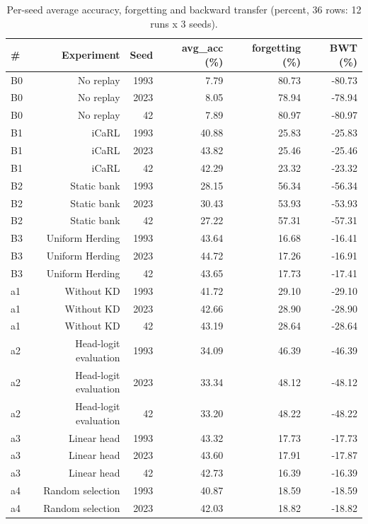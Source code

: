 \documentclass{article}
\begin{document}
\begin{table}[htbp]
  \centering
  \caption{Per-seed average accuracy, forgetting and backward transfer (percent, 36 rows: 12 runs x 3 seeds).}
  \label{tab:A4_per_seed_metrics}
  \begin{tabular}{lrrrrr}
    \toprule
    \textbf{\#} & \textbf{Experiment} & \textbf{Seed} & \textbf{avg\_acc (\%)} & \textbf{forgetting (\%)} & \textbf{BWT (\%)} \\
    \midrule
    B0 & No replay & 1993 & 7.79 & 80.73 & -80.73 \\
    B0 & No replay & 2023 & 8.05 & 78.94 & -78.94 \\
    B0 & No replay & 42 & 7.89 & 80.97 & -80.97 \\
    B1 & iCaRL & 1993 & 40.88 & 25.83 & -25.83 \\
    B1 & iCaRL & 2023 & 43.82 & 25.46 & -25.46 \\
    B1 & iCaRL & 42 & 42.29 & 23.32 & -23.32 \\
    B2 & Static bank & 1993 & 28.15 & 56.34 & -56.34 \\
    B2 & Static bank & 2023 & 30.43 & 53.93 & -53.93 \\
    B2 & Static bank & 42 & 27.22 & 57.31 & -57.31 \\
    B3 & Uniform Herding & 1993 & 43.64 & 16.68 & -16.41 \\
    B3 & Uniform Herding & 2023 & 44.72 & 17.26 & -16.91 \\
    B3 & Uniform Herding & 42 & 43.65 & 17.73 & -17.41 \\
    a1 & Without KD & 1993 & 41.72 & 29.10 & -29.10 \\
    a1 & Without KD & 2023 & 42.66 & 28.90 & -28.90 \\
    a1 & Without KD & 42 & 43.19 & 28.64 & -28.64 \\
    a2 & Head-logit evaluation & 1993 & 34.09 & 46.39 & -46.39 \\
    a2 & Head-logit evaluation & 2023 & 33.34 & 48.12 & -48.12 \\
    a2 & Head-logit evaluation & 42 & 33.20 & 48.22 & -48.22 \\
    a3 & Linear head & 1993 & 43.32 & 17.73 & -17.73 \\
    a3 & Linear head & 2023 & 43.60 & 17.91 & -17.87 \\
    a3 & Linear head & 42 & 42.73 & 16.39 & -16.39 \\
    a4 & Random selection & 1993 & 40.87 & 18.59 & -18.59 \\
    a4 & Random selection & 2023 & 42.03 & 18.82 & -18.82 \\

\end{tabular}
\end{table}
\end{document}
